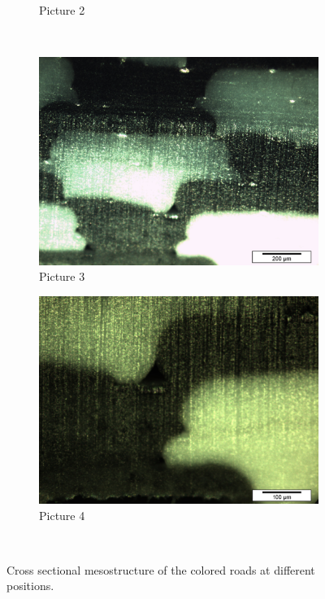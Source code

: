 \begin{figure}
\begin{subfigure}[b]{0.48\textwidth}
    \caption{Picture 2}
    \label{fig:2}
  \end{subfigure}
  \\
    \begin{subfigure}[b]{0.48\textwidth}
    \includegraphics[width=\textwidth]{chapter_4_RVE_Definition/figures/colored/Tv42_LI.jpg}
    \caption{Picture 3}
    \label{fig:3}
  \end{subfigure}
  \begin{subfigure}[b]{0.48\textwidth}
    \includegraphics[width=\textwidth]{chapter_4_RVE_Definition/figures/colored/Tv86a_LI.jpg}
    \caption{Picture 4}
    \label{fig:4}
  \end{subfigure}
  \\
  
  \caption{Cross sectional mesostructure of the colored roads at different positions. }
    \label{fig:Colored roads}
\end{figure}

